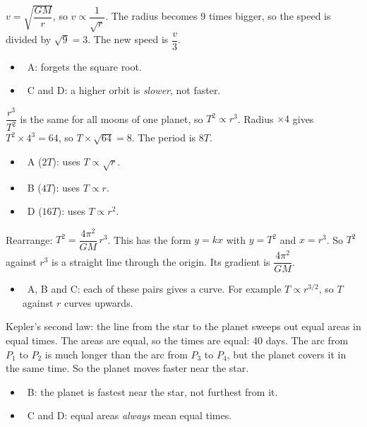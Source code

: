\begin{practiceanswers}
\begin{practiceans}
  $v = \sqrt{\dfrac{GM}{r}}$, so $v \propto \dfrac{1}{\sqrt{r}}$. The radius becomes 9 times
  bigger, so the speed is divided by $\sqrt{9} = 3$. The new speed is $\dfrac{v}{3}$.
  \begin{itemize}
    \item \xmark\ A: forgets the square root.
    \item \xmark\ C and D: a higher orbit is \emph{slower}, not faster.
  \end{itemize}
\end{practiceans}

\begin{practiceans}
  $\dfrac{r^3}{T^2}$ is the same for all moons of one planet, so $T^2 \propto r^3$. Radius
  $\times 4$ gives $T^2 \times 4^3 = 64$, so $T \times \sqrt{64} = 8$. The period is $8T$.
  \begin{itemize}
    \item \xmark\ A ($2T$): uses $T \propto \sqrt{r}$.
    \item \xmark\ B ($4T$): uses $T \propto r$.
    \item \xmark\ D ($16T$): uses $T \propto r^2$.
  \end{itemize}
\end{practiceans}

\begin{practiceans}
  Rearrange: $T^2 = \dfrac{4\pi^2}{GM}\, r^3$. This has the form $y = kx$ with $y = T^2$ and
  $x = r^3$. So $T^2$ against $r^3$ is a straight line through the origin. Its gradient is
  $\dfrac{4\pi^2}{GM}$.
  \begin{itemize}
    \item \xmark\ A, B and C: each of these pairs gives a curve. For example $T \propto r^{3/2}$, so $T$
          against $r$ curves upwards.
  \end{itemize}
\end{practiceans}

\begin{practiceans}
  Kepler's second law: the line from the star to the planet sweeps out equal areas in equal times.
  The areas are equal, so the times are equal: 40 days. The arc from $P_1$ to $P_2$ is much longer
  than the arc from $P_3$ to $P_4$, but the planet covers it in the same time. So the planet moves
  faster near the star.
  \begin{itemize}
    \item \xmark\ B: the planet is fastest near the star, not furthest from it.
    \item \xmark\ C and D: equal areas \emph{always} mean equal times.
  \end{itemize}
\end{practiceans}


\end{practiceanswers}
